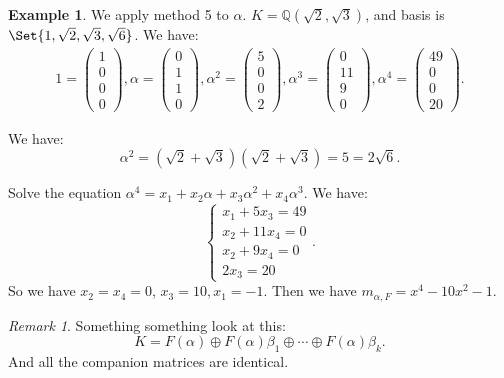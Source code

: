 \documentclass[9pt,reqno,twoside]{amsbook}
\theoremstyle{plain}
\numberwithin{section}{chapter}
\numberwithin{equation}{chapter}
\theoremstyle{definition}
\newtheorem{Ex}[theorem]{Example}
\theoremstyle{remark}
\newtheorem{rem}[theorem]{Remark}
\theoremstyle{plain}
\newcommand{\Q}{\mathbb{Q}}
\newcommand{\bee}{\begin{equation}\begin{aligned}}
\newcommand{\eee}{\end{aligned}\end{equation}}
\newcommand{\lpar}{\left(}
\newcommand{\rpar}{\right)}
\begin{document}
\begin{Ex}
We apply method 5 to $\alpha$. $K = \Q(\sqrt{2},\sqrt{3})$, and basis is $\Set{1, \sqrt{2}, \sqrt{3}, \sqrt{6}}$. We have:
\bee
1 = \lpar 
\begin{matrix}
1\\0\\0\\0
\end{matrix} \rpar , \alpha = \lpar 
\begin{matrix}
0\\
1\\
1\\
0
\end{matrix} \rpar ,
\alpha^2 = \lpar 
\begin{matrix}
5\\
0\\
0\\
2
\end{matrix} \rpar ,
\alpha^3 = \lpar 
\begin{matrix}
0\\
11\\
9\\
0
\end{matrix} \rpar ,
\alpha^4 = \lpar 
\begin{matrix}
49\\
0\\
0\\
20
\end{matrix} \rpar .
\eee

We have:
$$
\alpha^2 = (\sqrt{2} + \sqrt{3})(\sqrt{2} + \sqrt{3}) = 5 = 2\sqrt{6}.
$$

Solve the equation $\alpha^4 = x_1 + x_2\alpha + x_3\alpha^2 + x_4\alpha^3$. We have:
$$
\begin{cases}
x_1 + 5x_3 = 49\\
x_2 + 11x_4 = 0\\
x_2 + 9x_4 = 0\\
2x_3 = 20
\end{cases}.
$$
So we have $x_2 = x_4 = 0$, $x_3 = 10,x_1 = -1$. Then we have $m_{\alpha,F} = x^4 - 10x^2 - 1$. 

\end{Ex}

\begin{rem}
Something something look at this:
$$
K = F(\alpha) \oplus F(\alpha)\beta_1 \oplus \cdots \oplus F(\alpha)\beta_k.
$$
And all the companion matrices are identical. 
\end{rem}
\end{document}
